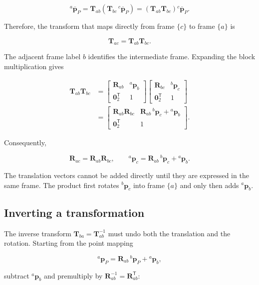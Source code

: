 \documentclass[
  australian,
  12pt,
  letterpaper,
  DIV=11,
  numbers=noendperiod,
  twoside]{scrreprt}
\begin{document}
\[
{}^{a}\overline{\mathbf p}_P
=
\mathbf T_{ab}
\left(
\mathbf T_{bc}\,{}^{c}\overline{\mathbf p}_P
\right)
=
\left(
\mathbf T_{ab}\mathbf T_{bc}
\right)
{}^{c}\overline{\mathbf p}_P.
\]

Therefore, the transform that maps directly from frame \(\{c\}\) to
frame \(\{a\}\) is

\[
\boxed{
\mathbf T_{ac}
=
\mathbf T_{ab}\mathbf T_{bc}
}.
\]

The adjacent frame label \(b\) identifies the intermediate frame.
Expanding the block multiplication gives

\[
\begin{aligned}
\mathbf T_{ab}\mathbf T_{bc}
&=
\begin{bmatrix}
\mathbf R_{ab}&{}^{a}\mathbf p_b\\
\mathbf 0_2^\mathsf T&1
\end{bmatrix}
\begin{bmatrix}
\mathbf R_{bc}&{}^{b}\mathbf p_c\\
\mathbf 0_2^\mathsf T&1
\end{bmatrix}\\
&=
\begin{bmatrix}
\mathbf R_{ab}\mathbf R_{bc}&
\mathbf R_{ab}\,{}^{b}\mathbf p_c+{}^{a}\mathbf p_b\\
\mathbf 0_2^\mathsf T&1
\end{bmatrix}.
\end{aligned}
\]

Consequently,

\[
\boxed{
\mathbf R_{ac}=\mathbf R_{ab}\mathbf R_{bc},
\qquad
{}^{a}\mathbf p_c
=
\mathbf R_{ab}\,{}^{b}\mathbf p_c
+
{}^{a}\mathbf p_b
}.
\]

The translation vectors cannot be added directly until they are
expressed in the same frame. The product first rotates
\({}^{b}\mathbf p_c\) into frame \(\{a\}\) and only then adds
\({}^{a}\mathbf p_b\).

\subsection{Inverting a
transformation}\label{sec-se2-inverting-transformation}

The inverse transform \(\mathbf T_{ba}=\mathbf T_{ab}^{-1}\) must undo
both the translation and the rotation. Starting from the point mapping

\[
{}^{a}\mathbf p_P
=
\mathbf R_{ab}\,{}^{b}\mathbf p_P
+
{}^{a}\mathbf p_b,
\]

subtract \({}^{a}\mathbf p_b\) and premultiply by
\(\mathbf R_{ab}^{-1}=\mathbf R_{ab}^\mathsf T\):
\end{document}
